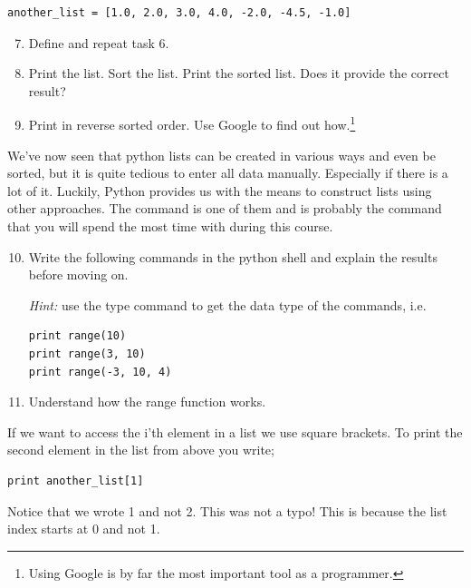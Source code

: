 \documentclass{article}
\begin{document}
\begin{lstlisting}
another_list = [1.0, 2.0, 3.0, 4.0, -2.0, -4.5, -1.0]
\end{lstlisting}


\begin{enumerate}
  \setcounter{enumi}{6}
  \item Define  and repeat task 6.

  \item Print the list. Sort the list. Print the sorted list.
  Does it provide the correct result?

  \item Print  in reverse sorted order.
    Use Google to find out how.\footnote{Using Google is
    by far the most important tool as a programmer.}
\end{enumerate}


We've now seen that python lists can be created in various ways and even be
sorted, but it is quite tedious to enter all data manually. Especially if
there is a lot of it.
Luckily, Python provides us with the means to construct
lists using other approaches.
The  command is one of them and is probably the
command that you will spend the most time with during this course.

\begin{enumerate}
  \setcounter{enumi}{9}
  \item Write the following commands in the python shell and explain the results
    before moving on.

    {\em Hint:} use the type command to get the data type of the commands,
    i.e. 

\begin{lstlisting}
print range(10)
print range(3, 10)
print range(-3, 10, 4)
\end{lstlisting}

  \item Understand how the range function works.
\end{enumerate}


If we want to access the i'th element in a list
we use square brackets. To print the second element
in the list from above you write;

\begin{lstlisting}
print another_list[1]
\end{lstlisting}

Notice that we wrote 1 and not 2. This was not a typo!
This is because the list index starts at 0 and not 1.\\
\end{document}
